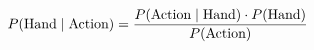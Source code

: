 \documentclass[preview]{standalone}
\begin{document}
\begin{align*}
\special{dvisvgm:raw <g id='unique000'>}P(\text{Hand} \mid \text{Action}) \special{dvisvgm:raw </g>}\special{dvisvgm:raw <g id='unique001'>}= \special{dvisvgm:raw </g>}\special{dvisvgm:raw <g id='unique002'>}\frac{P(\text{Action} \mid \text{Hand}) \cdot P(\text{Hand})}{P(\text{Action})}\special{dvisvgm:raw </g>}
\end{align*}
\end{document}
